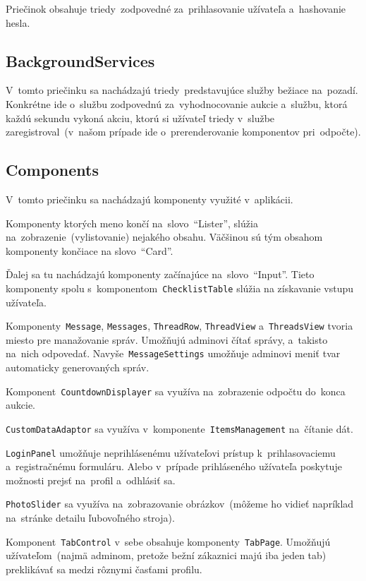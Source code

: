 Priečinok obsahuje triedy~zodpovedné za~prihlasovanie užívateľa a~hashovanie hesla.

\subsection{BackgroundServices}

V~tomto priečinku sa nachádzajú triedy~predstavujúce služby bežiace na~pozadí. Konkrétne ide o~službu zodpovednú za~vyhodnocovanie aukcie a~službu, ktorá každú sekundu vykoná akciu, ktorú si užívateľ triedy v~službe zaregistroval~(v~našom prípade ide o~prerenderovanie komponentov pri~odpočte).

\subsection{Components}

V~tomto priečinku sa nachádzajú komponenty využité v~aplikácii.

Komponenty ktorých meno končí na~slovo~``Lister'', slúžia na~zobrazenie~(vylistovanie) nejakého obsahu. Väčšinou sú tým obsahom komponenty končiace na slovo~``Card''.

Ďalej sa tu nachádzajú komponenty začínajúce na~slovo~``Input''. Tieto komponenty spolu s~komponentom~\verb|ChecklistTable| slúžia na získavanie vstupu užívateľa.

Komponenty~\verb|Message|, \verb|Messages|, \verb|ThreadRow|, \verb|ThreadView| a~\verb|ThreadsView| tvoria miesto pre manažovanie správ. Umožňujú adminovi čítať správy, a~takisto na~nich odpovedať. Navyše~\verb|MessageSettings| umožňuje adminovi meniť tvar automaticky generovaných správ.

Komponent~\verb|CountdownDisplayer| sa využíva na~zobrazenie odpočtu do~konca aukcie.

\verb|CustomDataAdaptor| sa využíva v~komponente~\verb|ItemsManagement| na~čítanie dát.

\verb|LoginPanel| umožňuje neprihlásenému užívateľovi prístup k~prihlasovaciemu a~registračnému formuláru. Alebo v~prípade prihláseného užívateľa poskytuje možnosti prejsť na~profil a~odhlásiť sa.

\verb|PhotoSlider| sa využíva na~zobrazovanie obrázkov~(môžeme ho vidieť napríklad na~stránke detailu ľubovoľného stroja).

Komponent~\verb|TabControl| v~sebe obsahuje komponenty~\verb|TabPage|. Umožňujú užívateľom~(najmä adminom, pretože bežní zákaznici majú iba jeden tab) preklikávať sa medzi rôznymi časťami profilu.

